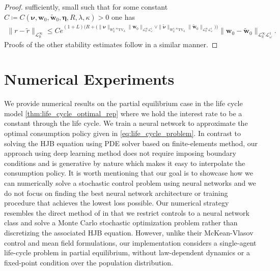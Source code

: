 \documentclass[11pt,oneside,english,reqno,dvipsnames,table]{amsart}
\numberwithin{equation}{section}
\theoremstyle{plain}
\theoremstyle{definition}
\theoremstyle{remark}
\newtheorem{rem}[thm]{\protect\remarkname}
\theoremstyle{plain}
\theoremstyle{plain}
\theoremstyle{plain}
\theoremstyle{plain}
\theoremstyle{plain}
\theoremstyle{plain}
\theoremstyle{plain}
\providecommand{\remarkname}{Remark}
\providecommand{\remarkname}{Remark}
\newcommand{\red}[1]{#1}
\newcommand{\bw}{\mathbf{w}}
\newcommand{\mbR}{\mathbb{R}}
\newcommand{\msL}{\mathscr{L}}
\newcommand{\bmeta}{\boldsymbol{\eta}}
\newcommand{\bnu}{\boldsymbol{\nu}}
\numberwithin{thm}{section}
\begin{document}
\begin{proof}
     sufficiently, small such that for some constant $C\coloneqq C(\bnu, \bw_0,\tilde{\bw}_0,\bmeta, R,\lambda,\kappa)>0$ one has
    \begin{align*}
    	\|r-\tilde{r}\|_{\msL^\infty_\mbR} \leq C e^{(1+L)\big(R + \big(\|\bnu\|_{W^{1,\infty}_{\mbR} \text{TV}_L} \|\bw_0\|_{\msL^\infty_{\mbR}\msL^1_{\omega}} \vee \|\tilde{\bnu}\|_{W^{1,\infty}_{\mbR} \text{TV}_L} \|\tilde{\bw}_0\|_{\msL^\infty_{\mbR}\msL^1_{\omega}} \big)\big) } \|\bw_0 -\tilde{\bw}_0\|_{\msL^\infty_\mbR \msL^1_\omega} .
    \end{align*}
Proofs of the other stability estimates follow in a similar manner.
\end{proof}
%
%
%
%
\section{Numerical Experiments}\label{sec:numerics}
%
We provide numerical results on the partial equilibrium case in the life cycle model \eqref{thm:life_cycle_optimal_rep} where we hold the interest rate to be a constant through the life cycle. We train a neural network to approximate the optimal consumption policy given in 
\eqref{eq:life_cycle_problem}. In contrast to solving the HJB equation using PDE solver based on finite-elements method, our approach using deep learning method does not require imposing boundary conditions and is generative by nature which makes it easy to interpolate the consumption policy. It is worth mentioning that our goal is to showcase how we can numerically solve a stochastic control problem using neural networks and we do not focus on finding the best neural network architecture or training procedure that achieves the lowest loss possible. Our numerical strategy resembles the direct method of \cite{carmona_lauriere2021} in that we restrict controls to a neural network class and solve a Monte Carlo stochastic optimization problem rather than discretizing the associated HJB equation. However, unlike their McKean-Vlasov control and mean field formulations, our implementation considers a single-agent life-cycle problem in partial equilibrium, without law-dependent dynamics or a fixed-point condition over the population distribution.
\end{document}

